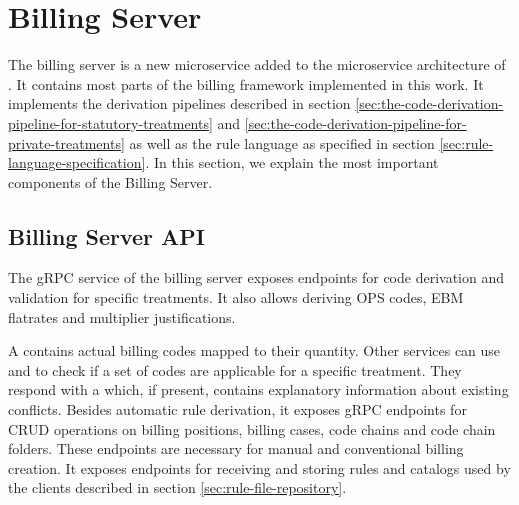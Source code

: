 \section{Billing Server}\label{sec:billing-server}
The billing server is a new microservice added to the microservice architecture of \AV.
It contains most parts of the billing framework implemented in this work.
It implements the derivation pipelines described in section \ref{sec:the-code-derivation-pipeline-for-statutory-treatments}
and \ref{sec:the-code-derivation-pipeline-for-private-treatments}
as well as the rule language as specified in section \ref{sec:rule-language-specification}.
In this section, we explain the most important components of the Billing Server.

\subsection{Billing Server API}\label{sec:billing-server-api}
The  gRPC service of the billing server exposes endpoints for code derivation and validation for specific treatments.
It also allows deriving OPS codes, EBM flatrates and multiplier justifications.



A  contains actual billing codes mapped to their quantity.
Other services can use  and  to check if a set of codes are applicable for a specific treatment.
They respond with a  which, if present, contains explanatory information about existing conflicts.
Besides automatic rule derivation, it exposes gRPC endpoints for CRUD operations on billing positions, billing cases, code chains and code chain folders.
These endpoints are necessary for manual and conventional billing creation.
It exposes endpoints for receiving and storing rules and catalogs used by the clients described in section \ref{sec:rule-file-repository}.


